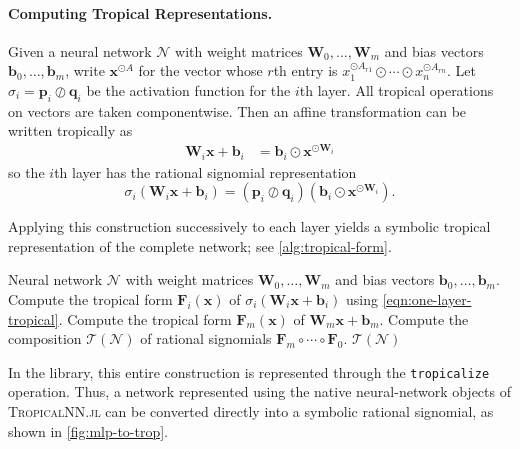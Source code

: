 \documentclass[10pt]{article}
\theoremstyle{definition}
\theoremstyle{remark}
\renewcommand{\vec}[1]{\mathbf{#1}}
\def\vb{{\vec{b}}}
\def\vp{{\vec{p}}}
\def\vq{{\vec{q}}}
\def\vx{{\vec{x}}}
\def\mF{{\bm{F}}}
\def\mW{{\bm{W}}}
\begin{document}
\paragraph{Computing Tropical Representations.} Given a neural network $\mathcal{N}$ with weight matrices $\mW_0, \dotsc, \mW_m$ and bias vectors $\vb_0, \dotsc, \vb_m$, write $\vx^{\odot A}$ for the vector whose $r$th entry is $x_1^{\odot A_{r1}} \odot \dotsb \odot x_n^{\odot A_{rn}}$. Let $\sigma_i = \vp_i \oslash \vq_i$ be the activation function for the $i$th layer. All tropical operations on vectors are taken componentwise. Then an affine transformation can be written tropically as
\begin{align*}
    \mW_i \vx + \vb_i & = \vb_i \odot \vx^{\odot \mW_i}
\end{align*}
so the $i$th layer has the rational signomial representation
\begin{equation} \label{eqn:one-layer-tropical}
\sigma_i(\mW_i \vx + \vb_i) = (\vp_i \oslash \vq_i)\left(\vb_i \odot \vx^{\odot \mW_i}\right).
\end{equation}

Applying this construction successively to each layer yields a symbolic tropical representation of the complete network; see
\cref{alg:tropical-form}.

\begin{algorithm}
    \begin{algorithmic}[1]
        \Require Neural network $\mathcal{N}$ with weight matrices $\mW_0, \dotsc, \mW_m$ and bias vectors $\vb_0, \dotsc, \vb_m$.
            \State Compute the tropical form $\mF_i(\vx)$ of $\sigma_i(\mW_i\vx + \vb_i)$ using \cref{eqn:one-layer-tropical}.
        \EndFor
        \State Compute the tropical form $\mF_m(\vx)$ of $\mW_m \vx + \vb_m$.
        \State Compute the composition $\mathcal{T}(\mathcal{N})$ of rational signomials $\mF_m \circ \dotsb \circ \mF_0$.
        \State \Return $\mathcal{T}(\mathcal{N})$
    \end{algorithmic}
    \caption{Computation of the rational signomial of a neural network}
    \label{alg:tropical-form}
\end{algorithm}

In the library, this entire construction is represented through the
\texttt{tropicalize} operation. Thus, a network represented using the
native neural-network objects of \textsc{TropicalNN.jl} can be converted directly into a symbolic rational signomial, as shown in \cref{fig:mlp-to-trop}.
\end{document}
